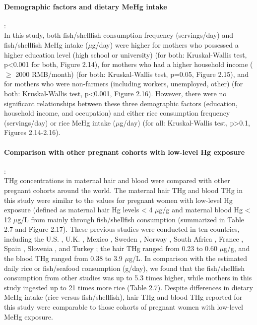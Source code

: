 \paragraph{Demographic factors and dietary MeHg intake}:\\ In this study, both fish/shellfish consumption frequency (servings/day) and fish/shellfish MeHg intake (\({\mu}\)g/day) were higher for mothers who possessed a higher education level (high school or university) (for both: Kruskal-Wallis test, p<0.001 for both, Figure 2.14), for mothers who had a higher household income ( ${\ge}$ 2000 RMB/month) (for both: Kruskal-Wallis test, p=0.05, Figure 2.15), and for mothers who were non-farmers (including workers, unemployed, other) (for both: Kruskal-Wallis test, p<0.001, Figure 2.16). However, there were no significant relationships between these three demographic factors (education, household income, and occupation) and either rice consumption frequency (servings/day) or rice MeHg intake (\({\mu}\)g/day) (for all: Kruskal-Wallis test, p>0.1, Figures 2.14-2.16). 

\paragraph {Comparison with other pregnant cohorts with low-level Hg exposure}:\\ THg concentrations in maternal hair and blood were compared with other pregnant cohorts around the world. The maternal hair THg and blood THg in this study were similar to the values for pregnant women with low-level Hg exposure (defined as maternal hair Hg levels < 4 \({\mu}\)g/g and maternal blood Hg < 12 \({\mu}\)g/L from \cite{karagas2012evidence} mainly through fish/shellfish consumption (summarized in Table 2.7 and Figure 2.17). These previous studies were conducted in ten countries, including the U.S. \citep{stern2001mercury,oken2005maternal,xue2007maternal,orenstein2014prenatal}, U.K. \citep{golding2013dietary},  Mexico \citep{basu2014mercury}, Sweden \citep{bjornberg2003methyl}, Norway \citep{brantsaeter2010exploration}, South Africa \citep{channa2013differences}, France \citep{drouillet2010prenatal}, Spain \citep{garcia2013lead}, Slovenia \citep{miklavvcivc2011biomarkers}, and Turkey \citep{unuvar2007mercury}; the hair THg ranged from 0.23 to 0.60 \({\mu}\)g/g, and the blood THg ranged from 0.38 to 3.9 \({\mu}\)g/L. In comparison with the estimated daily rice or fish/seafood consumption (g/day), we found that the fish/shellfish consumption from other studies was up to 5.3 times higher, while mothers in this study ingested up to 21 times more rice (Table 2.7). Despite differences in dietary MeHg intake (rice versus fish/shellfish), hair THg and blood THg reported for this study were comparable to those cohorts of pregnant women with low-level MeHg exposure. 

